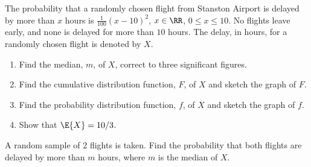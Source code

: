 \begin{problem}
    The probability that a randomly chosen flight from Stanston Airport is delayed by more than $x$ hours is $\frac{1}{100} (x-10)^2$, $x\in\RR$, $0\leq x\leq10$. No flights leave early, and none is delayed for more than $10$ hours. The delay, in hours, for a randomly chosen flight is denoted by $X$.

    \begin{enumerate}
        \item Find the median, $m$, of $X$, correct to three significant figures.
        \item Find the cumulative distribution function, $F$, of $X$ and sketch the graph of $F$.
        \item Find the probability distribution function, $f$, of $X$ and sketch the graph of $f$.
        \item Show that $\E{X} = 10/3$.
    \end{enumerate}

    A random sample of 2 flights is taken. Find the probability that both flights are delayed by more than $m$ hours, where $m$ is the median of $X$.
\end{problem}
